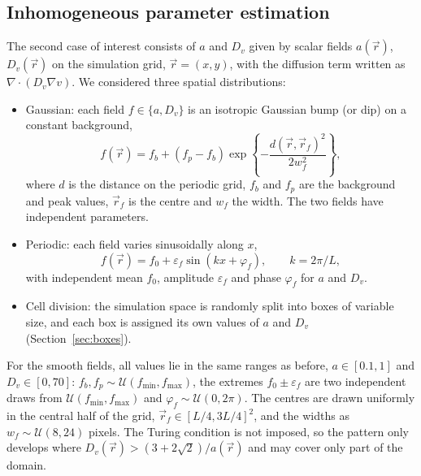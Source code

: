 \documentclass[12pt]{article}
\begin{document}
    \subsection{Inhomogeneous parameter estimation}
        The second case of interest consists of $a$ and $D_v$ given by scalar fields $a(\vec r)$, $D_v(\vec r)$ on the
        simulation grid, $\vec r = (x, y)$, with the diffusion term written as $\nabla\cdot(D_v\nabla v)$. We considered
        three spatial distributions:
        \begin{itemize}
            \item Gaussian: each field $f \in \{a, D_v\}$ is an isotropic Gaussian bump (or dip) on a constant background,
            \begin{equation*}
                f(\vec r) = f_b + (f_p - f_b)\exp\left\{-\frac{d{(\vec r, \vec r_f)}^2}{2 w_f^2}\right\},
            \end{equation*}
            where $d$ is the distance on the periodic grid, $f_b$ and $f_p$ are the background and peak values, $\vec r_f$
            is the centre and $w_f$ the width. The two fields have independent parameters.
            \item Periodic: each field varies sinusoidally along $x$,
            \begin{equation*}
                f(\vec r) = f_0 + \varepsilon_f \sin(k x + \varphi_f), \qquad k = 2\pi/L,
            \end{equation*}
            with independent mean $f_0$, amplitude $\varepsilon_f$ and phase $\varphi_f$ for $a$ and $D_v$.
            \item Cell division: the simulation space is randomly split into boxes of variable size, and each box is
            assigned its own values of $a$ and $D_v$ (Section~\ref{sec:boxes}).
        \end{itemize}
        For the smooth fields, all values lie in the same ranges as before, $a \in [0.1, 1]$ and $D_v \in [0, 70]$:
        $f_b, f_p \sim \mathcal U(f_{\min}, f_{\max})$, the extremes $f_0 \pm \varepsilon_f$ are two independent draws
        from $\mathcal U(f_{\min}, f_{\max})$ and $\varphi_f \sim \mathcal U(0, 2\pi)$. The centres are drawn uniformly
        in the central half of the grid, $\vec r_f \in {[L/4, 3L/4]}^2$, and the widths as $w_f \sim \mathcal U(8, 24)$
        pixels. The Turing condition is not imposed, so the pattern only develops where
        $D_v(\vec r) > (3 + 2\sqrt 2)/a(\vec r)$ and may cover only part of the domain.
\end{document}
